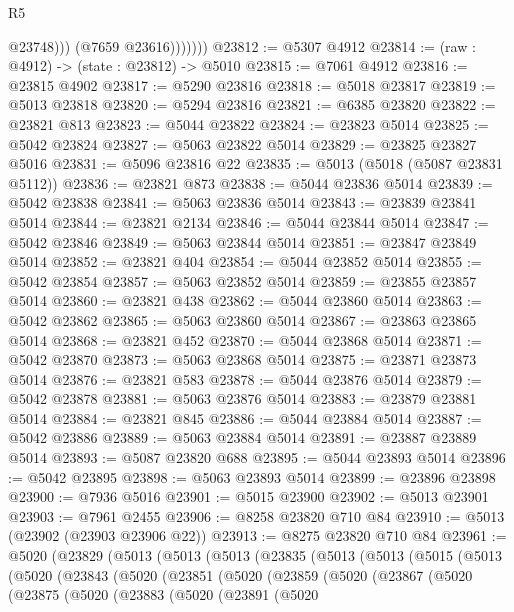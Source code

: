 \begin{lexlean}{R5}
\begin{coremodule}
                      @23748)))
                (@7659 @23616)))))))
@23812 := @5307 @4912
@23814 := (raw : @4912) -> (state : @23812) -> @5010
@23815 := @7061 @4912
@23816 := @23815 @4902
@23817 := @5290 @23816
@23818 := @5018 @23817
@23819 := @5013 @23818
@23820 := @5294 @23816
@23821 := @6385 @23820
@23822 := @23821 @813
@23823 := @5044 @23822
@23824 := @23823 @5014
@23825 := @5042 @23824
@23827 := @5063 @23822 @5014
@23829 := @23825 @23827 @5016
@23831 := @5096 @23816 @22
@23835 := @5013 (@5018 (@5087 @23831 @5112))
@23836 := @23821 @873
@23838 := @5044 @23836 @5014
@23839 := @5042 @23838
@23841 := @5063 @23836 @5014
@23843 := @23839 @23841 @5014
@23844 := @23821 @2134
@23846 := @5044 @23844 @5014
@23847 := @5042 @23846
@23849 := @5063 @23844 @5014
@23851 := @23847 @23849 @5014
@23852 := @23821 @404
@23854 := @5044 @23852 @5014
@23855 := @5042 @23854
@23857 := @5063 @23852 @5014
@23859 := @23855 @23857 @5014
@23860 := @23821 @438
@23862 := @5044 @23860 @5014
@23863 := @5042 @23862
@23865 := @5063 @23860 @5014
@23867 := @23863 @23865 @5014
@23868 := @23821 @452
@23870 := @5044 @23868 @5014
@23871 := @5042 @23870
@23873 := @5063 @23868 @5014
@23875 := @23871 @23873 @5014
@23876 := @23821 @583
@23878 := @5044 @23876 @5014
@23879 := @5042 @23878
@23881 := @5063 @23876 @5014
@23883 := @23879 @23881 @5014
@23884 := @23821 @845
@23886 := @5044 @23884 @5014
@23887 := @5042 @23886
@23889 := @5063 @23884 @5014
@23891 := @23887 @23889 @5014
@23893 := @5087 @23820 @688
@23895 := @5044 @23893 @5014
@23896 := @5042 @23895
@23898 := @5063 @23893 @5014
@23899 := @23896 @23898
@23900 := @7936 @5016
@23901 := @5015 @23900
@23902 := @5013 @23901
@23903 := @7961 @2455
@23906 := @8258 @23820 @710 @84
@23910 := @5013 (@23902 (@23903 @23906 @22))
@23913 := @8275 @23820 @710 @84
@23961 := @5020
    (@23829
      (@5013
        (@5013
          (@5013
            (@23835
              (@5013
                (@5013
                  (@5015
                    (@5013
                      (@5020
                        (@23843
                          (@5020
                            (@23851
                              (@5020
                                (@23859
                                  (@5020
                                    (@23867
                                      (@5020
                                        (@23875
                                          (@5020
                                            (@23883
                                              (@5020
                                                (@23891
                                                  (@5020

\end{coremodule}
\end{lexlean}
